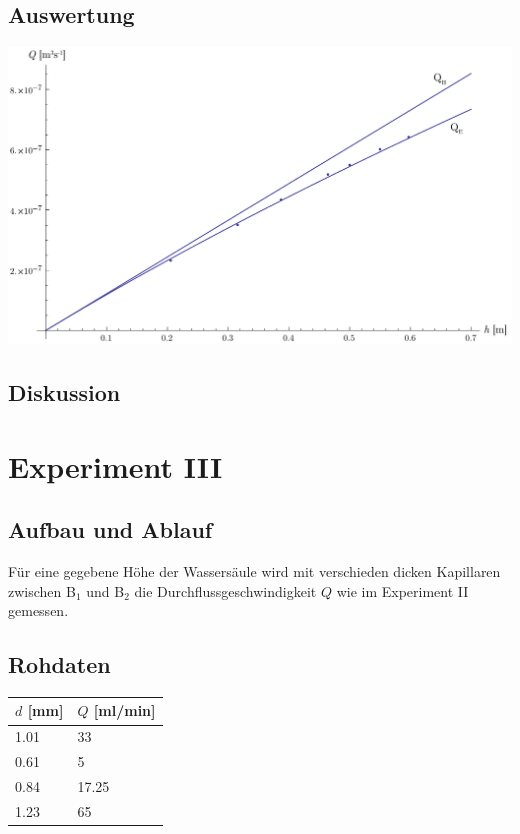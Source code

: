\documentclass[12pt,a4paper]{article}
\newcommand{\subscript}[1]{$_{#1}$}
\newcommand{\B}[1]{B\subscript{#1}}
\begin{document}
\subsection*{Auswertung}
\begin{center}
\includegraphics[width=15cm]{diagram2.pdf}
\end{center}

\subsection*{Diskussion}


\section*{Experiment III}

\subsection*{Aufbau und Ablauf}
F\"ur eine gegebene H\"ohe der Wassers\"aule wird mit verschieden dicken Kapillaren zwischen \B{1} und \B{2} die Durchflussgeschwindigkeit $Q$ wie im Experiment II gemessen.

\subsection*{Rohdaten}
\begin{tabular}{|l|l|}
\hline
$d$ [mm]&$Q$ [ml/min]\\
\hline
1.01&33\\
0.61&5\\
0.84&17.25\\
1.23&65\\
\hline
\end{tabular}
\end{document}
